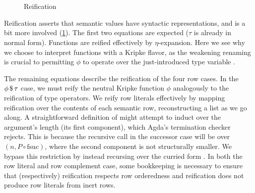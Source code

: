 \documentclass[sigplan,screen]{acmart}
\begin{document}
\begin{figure}[t]
\begin{AgdaAlign}
\begin{code}[hide]
\AgdaSymbol{)}\AgdaSpace{}%
\AgdaSymbol{=}\AgdaSpace{}%
\<%
\\
%
\>[2]\AgdaSpace{}%
\AgdaSymbol{(}\AgdaSpace{}%
\AgdaSpace{}%
\AgdaSymbol{)}\AgdaSpace{}%
\AgdaSymbol{(}\AgdaSpace{}%
\AgdaOperator{\AgdaInductiveConstructor{\$}}\AgdaSpace{}%
\AgdaSymbol{)}\AgdaSpace{}%
\AgdaSymbol{(}\AgdaSpace{}%
\AgdaSymbol{)}\AgdaSpace{}%
\AgdaSymbol{=}\AgdaSpace{}%
\<%
\\
%
\>[2]\AgdaSpace{}%
\AgdaSymbol{(}\AgdaSpace{}%
\AgdaSpace{}%
\AgdaSymbol{)}\AgdaSpace{}%
\AgdaSpace{}%
\AgdaSymbol{(}\AgdaSpace{}%
\AgdaSymbol{)}\AgdaSpace{}%
\AgdaSymbol{=}\AgdaSpace{}%
\<%
\end{code}
\caption{Reification}
\label{fig:reification}
\end{AgdaAlign}
\end{figure}

Reification asserts that semantic values have syntactic representations, and is a bit more involved (\cref{fig:reification}). The first two equations are expected ($\tau$ is already in normal form). Functions are reified effectively by $\eta$\--expan\-sion. Here we see why we choose to interpret functions with a Kripke flavor, as the weakening renaming  is crucial to permitting $\phi$ to operate over the just-introduced type variable . 

The remaining equations describe the reification of the four row cases. In the ${\phi} \, \mathdollar \, \tau$ case, we must reify the neutral Kripke function $\phi$ analogously to the reification of type operators. We reify row literals effectively by mapping reification over the contents of each semantic row, reconstructing a list as we go along. A straightforward definition of  might attempt to induct over the  argument's length (its first component), which Agda's termination checker rejects. This is because the recursive call in the successor case will be over $(n , P \circ \text{fsuc})$, where the second component is not structurally smaller. We bypass this restriction by instead recursing over the curried form . In both the row literal and row complement case, some bookkeeping is necessary to ensure that (respectively) reification respects row orderedness and reification does not produce row literals from inert rows.
\end{document}
